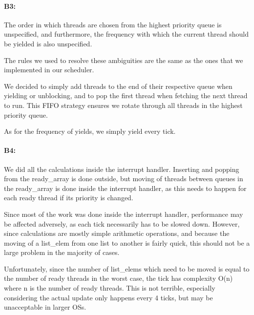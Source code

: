 \paragraph{B3:} %

The order in which threads are chosen from the highest priority queue is
unspecified, and furthermore, the frequency with which the current thread should
be yielded is also unspecified.

The rules we used to resolve these ambiguities are the same as the ones that we
implemented in our scheduler.

We decided to simply add threads to the end of their respective queue when
yielding or unblocking, and to pop the first thread when fetching the next
thread to run. This FIFO strategy ensures we rotate through all threads in the
highest priority queue.

As for the frequency of yields, we simply yield every tick.

\paragraph{B4:} %

We did all the calculations inside the interrupt handler. Inserting and popping
from the ready\_array is done outside, but moving of threads between queues in
the ready\_array is done inside the interrupt handler, as this needs to happen
for each ready thread if its priority is changed.

Since most of the work was done inside the interrupt handler, performance may be
affected adversely, as each tick necessarily has to be slowed down. However,
since calculations are mostly simple arithmetic operations, and because the
moving of a list\_elem from one list to another is fairly quick, this should not
be a large problem in the majority of cases.

Unfortunately, since the number of list\_elems which need to be moved is equal
to the number of ready threads in the worst case, the tick has complexity O(n)
where n is the number of ready threads. This is not terrible, especially
considering the actual update only happens every 4 ticks, but may be
unacceptable in larger OSs.

